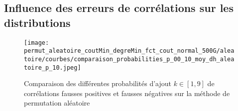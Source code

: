 \documentclass[onecolumn, 12pt]{book}
\begin{document}
\subsection{Influence des erreurs de corr\'elations sur les distributions}
\begin{figure}[htb!] 
\centering
\texttt{[image: permut\_aleatoire\_coutMin\_degreMin\_fct\_cout\_normal\_500G/aleatoire/courbes/comparaison\_probabilities\_p\_00\_10\_moy\_dh\_aleatoire\_p\_10.jpeg]}
\caption{ Comparaison des diff\'erentes probabilit\'es d'ajout $k \in [1,9]$ de corr\'elations fausses positives et fausses n\'egatives sur la m\'ethode de permutation al\'eatoire }
\label{compareDifferentesProbabilitesP0_1_fct_cout_unitaire_p05} 
\end{figure}
\end{document}
